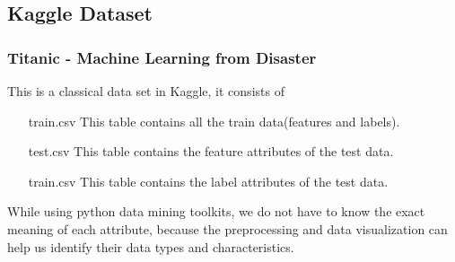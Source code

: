 \documentclass{beamer}
\begin{document}
\subsection{Kaggle Dataset}
\begin{frame}
	\frametitle{Titanic - Machine Learning from Disaster}


	\begin{flushleft}
		This is a classical data set in Kaggle, it consists of
		\begin{center}
			\begin{minipage}{0.8\textwidth}
				\begin{itemize}
					\item[train.csv] This table contains all the train data(features and labels).
					\item[test.csv] This table contains the feature attributes of the test data.
					\item[train.csv] This table contains the label attributes of the test data.
				\end{itemize}
			\end{minipage}
		\end{center}
		While using python data mining toolkits, we do not have to know the exact meaning of each attribute, because the preprocessing and data visualization can help us identify their data types and characteristics.
	\end{flushleft}
\end{frame}

\end{document}
